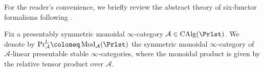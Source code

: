 For the reader's convenience, we briefly review the abstract theory of six-functor formalisms following \cite{Liu_Zheng2012, Mann2022, Scholze2025, Cnossen_Lenz_Linskens2026}.

Fix a presentably symmetric monoidal $\infty$-category $\mathcal A \in \operatorname{CAlg}(\Prlst)$. We denote by $\mathrm{Pr}^{\mathrm{L}}_{\mathcal A} \coloneq \operatorname{Mod}_{\mathcal A}(\Prlst)$ the symmetric monoidal $\infty$-category of $\mathcal A$-linear presentable stable $\infty$-categories, where the monoidal product is given by the relative tensor product over $\mathcal A$. 


